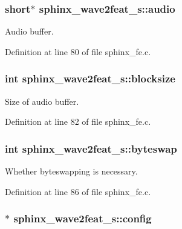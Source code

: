 \subsubsection[{audio}]{\setlength{\rightskip}{0pt plus 5cm}short$\ast$ sphinx\-\_\-wave2feat\-\_\-s\-::audio}\label{structsphinx__wave2feat__s_a776c72734abe1e34162a5ee347f533e5}


Audio buffer. 



Definition at line 80 of file sphinx\-\_\-fe.\-c.

\subsubsection[{blocksize}]{\setlength{\rightskip}{0pt plus 5cm}int sphinx\-\_\-wave2feat\-\_\-s\-::blocksize}\label{structsphinx__wave2feat__s_aff2646e41780ceb9dcd234c719fd25f1}


Size of audio buffer. 



Definition at line 82 of file sphinx\-\_\-fe.\-c.

\subsubsection[{byteswap}]{\setlength{\rightskip}{0pt plus 5cm}int sphinx\-\_\-wave2feat\-\_\-s\-::byteswap}\label{structsphinx__wave2feat__s_a030717e2736fd04d1a281f51e5db2799}


Whether byteswapping is necessary. 



Definition at line 86 of file sphinx\-\_\-fe.\-c.

\subsubsection[{config}]{$\ast$ sphinx\-\_\-wave2feat\-\_\-s\-::config}\label{structsphinx__wave2feat__s_a484d308befbde315664da8520ebc410d}


